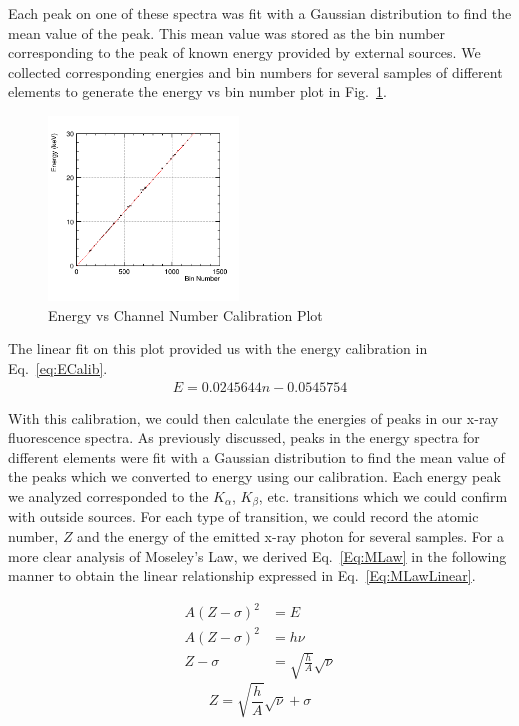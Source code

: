 \documentclass[%
 reprint,
 amsmath,amssymb,
 aps,
 pra,
]{revtex4-1}
\begin{document}
Each peak on one of these spectra was fit with a Gaussian distribution to find the mean value of the peak. This mean value was stored as the bin number corresponding to the peak of known energy provided by external sources. We collected corresponding energies and bin numbers for several samples of different elements to generate the energy vs bin number plot in Fig.~\ref{Fig:Evsbin}.

\begin{figure}[H]
	\centering
	\includegraphics[width=0.45\textwidth]{EvsBin.png}
	\caption{Energy vs Channel Number Calibration Plot}
	\label{Fig:Evsbin}
\end{figure}

The linear fit on this plot provided us with the energy calibration in Eq.~\ref{eq:ECalib}.
\begin{gather}\label{eq:ECalib}
E = 0.0245644n - 0.0545754
\end{gather}

With this calibration, we could then calculate the energies of peaks in our x-ray fluorescence spectra. As previously discussed, peaks in the energy spectra for different elements were fit with a Gaussian distribution to find the mean value of the peaks which we converted to energy using our calibration. Each energy peak we analyzed corresponded to the $K_{\alpha}$, $K_{\beta}$, etc. transitions which we could confirm with outside sources. For each type of transition, we could record the atomic number, $Z$ and the energy of the emitted x-ray photon for several samples. For a more clear analysis of Moseley's Law, we derived Eq.~\ref{Eq:MLaw} in the following manner to obtain the linear relationship expressed in Eq.~\ref{Eq:MLawLinear}.

\begin{align*}
A(Z - \sigma)^{2} &= E\\
A(Z - \sigma)^{2} &= h \nu\\
Z - \sigma &= \sqrt{\frac{h}{A}}\sqrt{\nu}
\end{align*}
\begin{equation}\label{Eq:MLawLinear}
Z = \sqrt{\frac{h}{A}}\sqrt{\nu} + \sigma
\end{equation}
\end{document}
